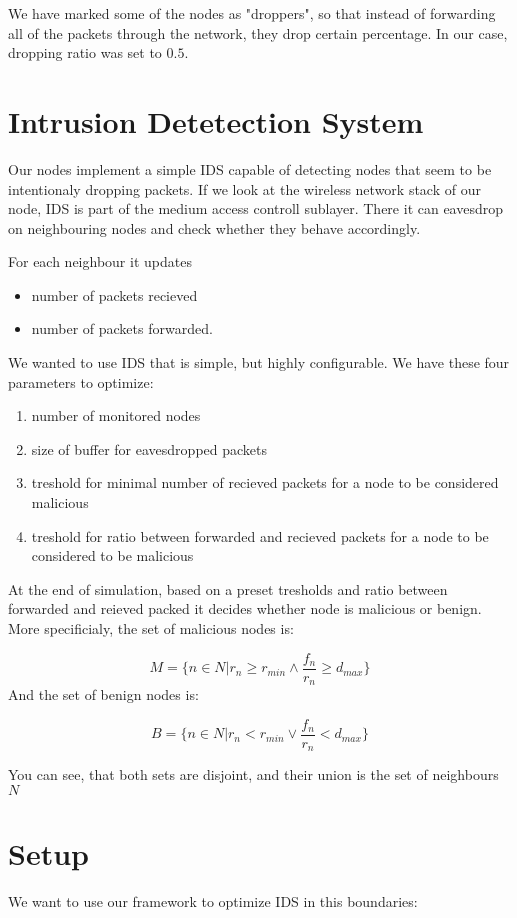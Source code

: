 \documentclass[12pt,oneside]{fithesis2}
\begin{document}
We have marked some of the nodes as "droppers", so that instead of forwarding all of the packets through the network, they drop certain percentage. In our case, dropping ratio was set to $0.5$.

\section{Intrusion Detetection System}
Our nodes implement a simple IDS capable of detecting nodes that seem to be intentionaly dropping packets.
If we look at the wireless network stack of our node, IDS is part of the medium access controll sublayer.
There it can eavesdrop on neighbouring nodes and check whether they behave accordingly.

For each neighbour it updates 
\begin{itemize}
\item number of packets recieved 
\item number of packets forwarded.
\end{itemize}

We wanted to use IDS that is simple, but highly configurable. 
We have these four parameters to optimize:
\begin{enumerate}
\item number of monitored nodes
\item size of buffer for eavesdropped packets
\item treshold for minimal number of recieved packets for a node to be considered malicious
\item treshold for ratio between forwarded and recieved packets for a node to be considered to be malicious
\end{enumerate}
At the end of simulation, based on a preset tresholds and ratio between forwarded and reieved packed it decides whether node is malicious or benign. More specificialy, the set of malicious nodes is:

$$ M = \{n \in N|r_n \geq r_{min} \land \frac{f_n}{r_n} \geq d_{max} \} $$
And the set of benign nodes is:

$$B = \{n \in N|r_n < r_{min} \lor \frac{f_n}{r_n} < d_{max} \} $$

You can see, that both sets are disjoint, and their union is the set of neighbours $N$

\section{Setup}
We want to use our framework to optimize IDS in this boundaries:
\end{document}
